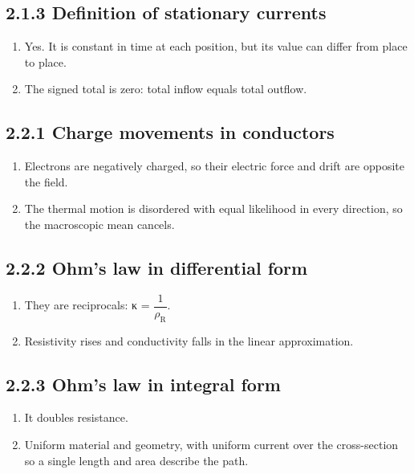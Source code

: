\documentclass[11pt]{article}
\begin{document}
\begin{keepsection}\subsection{2.1.3 Definition of stationary currents}

\begin{enumerate}
\item Yes. It is constant in time at each position, but its value can differ from place to place.
\item The signed total is zero: total inflow equals total outflow.
\end{enumerate}

\end{keepsection}
\begin{keepsection}\subsection{2.2.1 Charge movements in conductors}

\begin{enumerate}
\item Electrons are negatively charged, so their electric force and drift are opposite the field.
\item The thermal motion is disordered with equal likelihood in every direction, so the macroscopic mean cancels.
\end{enumerate}

\end{keepsection}
\begin{keepsection}\subsection{2.2.2 Ohm’s law in differential form}

\begin{enumerate}
\item They are reciprocals: κ = {\small\ensuremath{\dfrac{1}{ρ_{\mathrm{R}}}}}.
\item Resistivity rises and conductivity falls in the linear approximation.
\end{enumerate}

\end{keepsection}
\begin{keepsection}\subsection{2.2.3 Ohm’s law in integral form}

\begin{enumerate}
\item It doubles resistance.
\item Uniform material and geometry, with uniform current over the cross-section so a single length and area describe the path.
\end{enumerate}

\end{keepsection}
\end{document}
